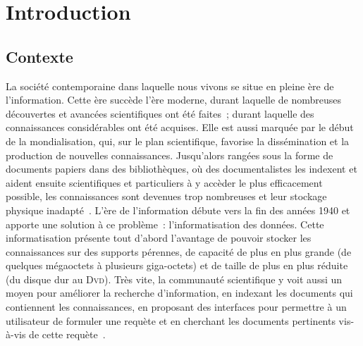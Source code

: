 \chapter{Introduction}
\label{chap:main-introduction}


  \section{Contexte}
  \label{sec:main-introduction-context}
    La société contemporaine dans laquelle nous vivons se situe en pleine ère de
    l'information. Cette ère succède l'ère moderne, durant laquelle de
    nombreuses découvertes et avancées scientifiques ont été faites~; durant
    laquelle des connaissances considérables ont été acquises. Elle  est aussi
    marquée par le début de la mondialisation, qui, sur le plan scientifique,
    favorise la dissémination et la production de nouvelles connaissances.
    Jusqu'alors rangées sous la forme de documents papiers dans des
    bibliothèques, où des documentalistes les indexent et aident ensuite
    scientifiques et particuliers à y accèder le plus efficacement possible, les
    connaissances sont devenues trop nombreuses et leur stockage physique
    inadapté~\cite{rider1946thegreatdilemmaofworldorganization}. L'ère de
    l'information débute vers la fin des années 1940 et apporte une solution à
    ce problème~: l'informatisation des données. Cette informatisation présente
    tout d'abord l'avantage de pouvoir stocker les connaissances sur des
    supports pérennes, de capacité de plus en plus grande (de quelques
    mégaoctets à plusieurs giga-octets) et de taille de plus en plus réduite (du
    disque dur au \textsc{Dvd}). Très vite, la communauté scientifique y voit
    aussi un moyen pour améliorer la recherche d'information, en indexant les
    documents qui contiennent les connaissances, en proposant des interfaces
    pour permettre à un utilisateur de formuler une requète et en cherchant les
    documents pertinents vis-à-vis de cette requète~\cite{salton1975tfidf}.

